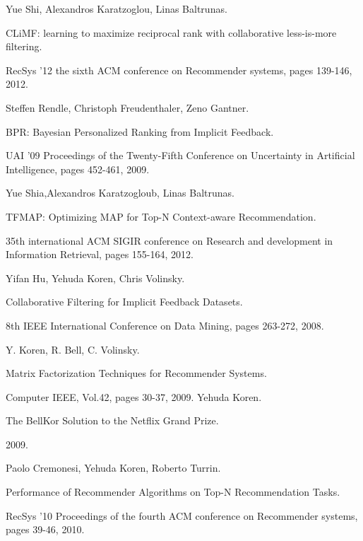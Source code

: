 \documentclass[14pt]{extarticle}
\begin{document}
	\begin{thebibliography}{00} %
    	
    	Yue Shi, Alexandros Karatzoglou, Linas Baltrunas.
    	
CLiMF: learning to maximize reciprocal rank with collaborative less-is-more filtering. 	
    	
    RecSys '12 the sixth ACM conference on Recommender systems, pages 139-146,  2012.    	
    	
         
	     Steffen Rendle, Christoph Freudenthaler, Zeno Gantner.    
         
         BPR: Bayesian Personalized Ranking from Implicit Feedback.
         
         UAI '09 Proceedings of the Twenty-Fifth Conference on Uncertainty in Artificial Intelligence, pages 452-461,  2009.
         
		
		Yue Shia,Alexandros Karatzogloub, Linas Baltrunas.
		
TFMAP: Optimizing MAP for Top-N Context-aware Recommendation.		
		
		35th international ACM SIGIR conference on Research and development in Information Retrieval, pages 155-164, 2012.
		
	Yifan Hu, Yehuda Koren, Chris Volinsky.
	
	Collaborative Filtering for Implicit Feedback Datasets.
	
	8th IEEE International Conference on Data Mining, pages 263-272, 2008.
	
	
	Y. Koren, R. Bell, C. Volinsky.	
	
	Matrix Factorization Techniques for Recommender Systems.
		
	
	Computer IEEE, Vol.42, pages 30-37, 2009.
	Yehuda Koren.
	
	The BellKor Solution to the Netflix Grand Prize. 
	
	2009.

	
    Paolo Cremonesi, Yehuda Koren, Roberto Turrin.	
	
	Performance of Recommender Algorithms on Top-N Recommendation Tasks.
	
	RecSys '10 Proceedings of the fourth ACM conference on Recommender systems, pages 39-46, 2010.
	

\end{thebibliography}
\end{document}
